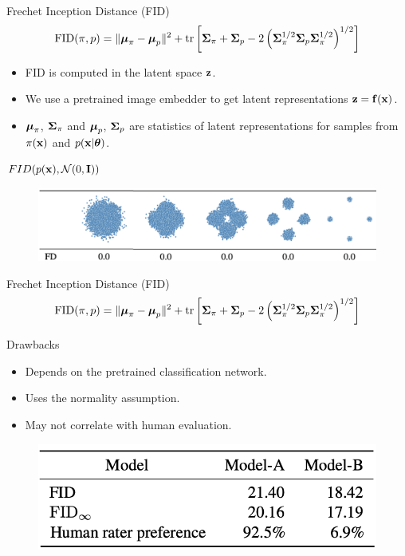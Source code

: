 \documentclass{beamer}
\begin{document}
\begin{frame}{Frechet Inception Distance (FID)}
	\vspace{-0.3cm}
	\[
		\mathrm{FID} (\pi, p) = \| \boldsymbol{\mu}_{\pi} - \boldsymbol{\mu}_{p}\|^2 + \text{tr} \left[ \boldsymbol{\Sigma}_{\pi} + \boldsymbol{\Sigma}_p - 2 \left(\boldsymbol{\Sigma}_{\pi}^{1/2} \boldsymbol{\Sigma}_p \boldsymbol{\Sigma}_{\pi}^{1/2} \right)^{1/2} \right]
	\]
	\vspace{-0.5cm}
	\begin{itemize}
		\item FID is computed in the latent space $\mathbf{z}$.
		\item We use a pretrained image embedder to get latent representations $\mathbf{z} = \mathbf{f}(\mathbf{x})$.
		\item $\boldsymbol{\mu}_{\pi}$, $\boldsymbol{\Sigma}_{\pi}$ and $\boldsymbol{\mu}_{p}$, $\boldsymbol{\Sigma}_p$ are statistics of latent representations for samples from $\pi(\mathbf{x})$ and $p(\mathbf{x} | \boldsymbol{\theta})$.
	\end{itemize}
	\eqpause
	\begin{block}{$FID(p(\mathbf{x}), \mathcal{N}(0, \mathbf{I}))$}
		\begin{figure}
			\includegraphics[width=0.95\linewidth]{figs/fid_normal}
		\end{figure}
	\end{block}
\end{frame}
\begin{frame}{Frechet Inception Distance (FID)}
	\vspace{-0.4cm}
	\[
		\mathrm{FID} (\pi, p) =  \| \boldsymbol{\mu}_{\pi} - \boldsymbol{\mu}_{p}\|^2 + \text{tr} \left[ \boldsymbol{\Sigma}_{\pi} + \boldsymbol{\Sigma}_p - 2 \left(\boldsymbol{\Sigma}_{\pi}^{1/2} \boldsymbol{\Sigma}_p \boldsymbol{\Sigma}_{\pi}^{1/2} \right)^{1/2} \right]
	\]
	\eqpause
	\vspace{-0.3cm}
	\begin{block}{Drawbacks}
		\begin{itemize}
			\item Depends on the pretrained classification network.
			\item Uses the normality assumption.
			\item May not correlate with human evaluation.
		\end{itemize}
	\end{block}
	\eqpause
	\begin{figure}
		\includegraphics[width=0.7\linewidth]{figs/fid_vs_human_eval}
	\end{figure}
\end{frame}
\end{document}
